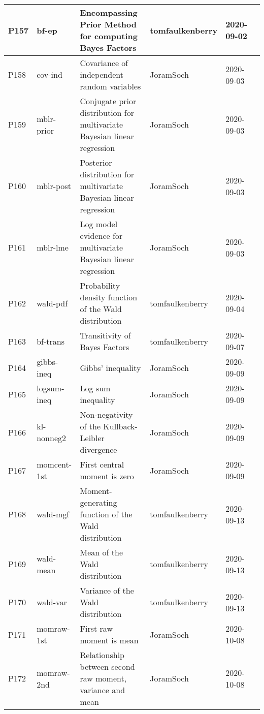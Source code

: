 \documentclass[a4paper,12pt,twoside]{book}
\begin{document}
\begin{longtable}{|p{1cm}|p{2cm}|p{6.5cm}|p{3cm}|p{2cm}|c|}
P157 & bf-ep & Encompassing Prior Method for computing Bayes Factors & tomfaulkenberry & 2020-09-02 & \pageref{sec:bf-ep} \\ \hline
P158 & cov-ind & Covariance of independent random variables & JoramSoch & 2020-09-03 & \pageref{sec:cov-ind} \\ \hline
P159 & mblr-prior & Conjugate prior distribution for multivariate Bayesian linear regression & JoramSoch & 2020-09-03 & \pageref{sec:mblr-prior} \\ \hline
P160 & mblr-post & Posterior distribution for multivariate Bayesian linear regression & JoramSoch & 2020-09-03 & \pageref{sec:mblr-post} \\ \hline
P161 & mblr-lme & Log model evidence for multivariate Bayesian linear regression & JoramSoch & 2020-09-03 & \pageref{sec:mblr-lme} \\ \hline
P162 & wald-pdf & Probability density function of the Wald distribution & tomfaulkenberry & 2020-09-04 & \pageref{sec:wald-pdf} \\ \hline
P163 & bf-trans & Transitivity of Bayes Factors & tomfaulkenberry & 2020-09-07 & \pageref{sec:bf-trans} \\ \hline
P164 & gibbs-ineq & Gibbs' inequality & JoramSoch & 2020-09-09 & \pageref{sec:gibbs-ineq} \\ \hline
P165 & logsum-ineq & Log sum inequality & JoramSoch & 2020-09-09 & \pageref{sec:logsum-ineq} \\ \hline
P166 & kl-nonneg2 & Non-negativity of the Kullback-Leibler divergence & JoramSoch & 2020-09-09 & \pageref{sec:kl-nonneg2} \\ \hline
P167 & momcent-1st & First central moment is zero & JoramSoch & 2020-09-09 & \pageref{sec:momcent-1st} \\ \hline
P168 & wald-mgf & Moment-generating function of the Wald distribution & tomfaulkenberry & 2020-09-13 & \pageref{sec:wald-mgf} \\ \hline
P169 & wald-mean & Mean of the Wald distribution & tomfaulkenberry & 2020-09-13 & \pageref{sec:wald-mean} \\ \hline
P170 & wald-var & Variance of the Wald distribution & tomfaulkenberry & 2020-09-13 & \pageref{sec:wald-var} \\ \hline
P171 & momraw-1st & First raw moment is mean & JoramSoch & 2020-10-08 & \pageref{sec:momraw-1st} \\ \hline
P172 & momraw-2nd & Relationship between second raw moment, variance and mean & JoramSoch & 2020-10-08 & \pageref{sec:momraw-2nd} \\ \hline

\end{longtable}
\end{document}
